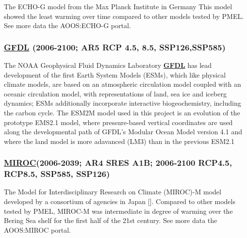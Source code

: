 \documentclass[
]{article}
\begin{document}
The ECHO-G model from the Max Planck Institute in Germany This model
showed the least warming over time compared to other models tested by
PMEL. See more data the AOOS:ECHO-G portal.

\hypertarget{gfdl-2006-2100-ar5-rcp-4.5-8.5-ssp126ssp585}{%
\subsubsection{\texorpdfstring{\href{http://www.gfdl.noaa.gov/earth-system-model}{GFDL}
(2006-2100; AR5 RCP 4.5, 8.5,
SSP126,SSP585)}{GFDL (2006-2100; AR5 RCP 4.5, 8.5, SSP126,SSP585)}}\label{gfdl-2006-2100-ar5-rcp-4.5-8.5-ssp126ssp585}}

The NOAA Geophysical Fluid Dynamics Laboratory
\href{http://www.gfdl.noaa.gov}{\textbf{GFDL}} has lead development of
the first Earth System Models (ESMs), which like physical climate
models, are based on an atmospheric circulation model coupled with an
oceanic circulation model, with representations of land, sea ice and
iceberg dynamics; ESMs additionally incorporate interactive
biogeochemistry, including the carbon cycle. The ESM2M model used in
this project is an evolution of the prototype EMS2.1 model, where
pressure-based vertical coordinates are used along the developmental
path of GFDL's Modular Ocean Model version 4.1 and where the land model
is more adavanced (LM3) than in the previous ESM2.1

\hypertarget{miroc2006-2039-ar4-sres-a1b-2006-2100-rcp4.5-rcp8.5-ssp585-ssp126}{%
\subsubsection{\texorpdfstring{\href{www.cger.nies.go.jp/publications/report/i073/I073.pdf}{MIROC}(2006-2039;
AR4 SRES A1B; 2006-2100 RCP4.5, RCP8.5, SSP585,
SSP126)}{MIROC(2006-2039; AR4 SRES A1B; 2006-2100 RCP4.5, RCP8.5, SSP585, SSP126)}}\label{miroc2006-2039-ar4-sres-a1b-2006-2100-rcp4.5-rcp8.5-ssp585-ssp126}}

The Model for Interdisciplinary Research on Climate (MIROC)-M model
developed by a consortium of agencies in Japan {[}{]}. Compared to other
models tested by PMEL, MIROC-M was intermediate in degree of warming
over the Bering Sea shelf for the first half of the 21st century. See
more data the AOOS:MIROC portal.
\end{document}
